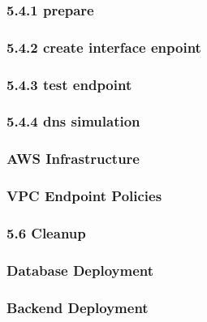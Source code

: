 \subsubsection{5.4.1 prepare}


\subsubsection{5.4.2 create interface enpoint}


\subsubsection{5.4.3 test endpoint}


\subsubsection{5.4.4 dns simulation}


\subsubsection{AWS Infrastructure}


\subsubsection{VPC Endpoint Policies}


\subsubsection{5.6 Cleanup}


\subsubsection{Database Deployment}


\subsubsection{Backend Deployment}


